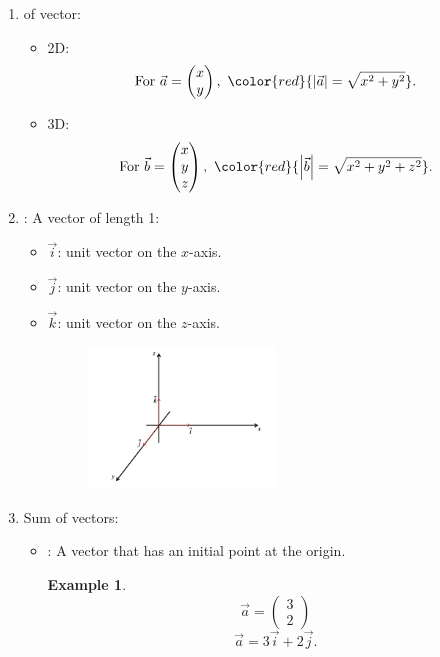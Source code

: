 \documentclass[12pt, a4paper]{article}
\newtheorem{example}{Example}[subsection]
\begin{document}
\begin{enumerate}
\begin{itemize}
  \end{itemize}
  \item \textbf{\color{red}{Magnitude/Modulus}} of vector: 
  \begin{itemize}
    \item 2D: $$\text{For }\vec{a}=\begin{pmatrix}x\\y\end{pmatrix},\ {\color{red}{\left|\vec{a}\right|=\sqrt{x^2+y^2}}}.$$
    \item 3D: $$\text{For }\vec{b}=\begin{pmatrix}x\\y\\z\end{pmatrix},\ {\color{red}{\left|\vec{b}\right|=\sqrt{x^2+y^2+z^2}}}.$$
  \end{itemize}
  \item \textbf{\color{red}{Unit Vector}}: A vector of length 1: 
  \begin{itemize}
    \item $\vec{i}$: unit vector on the $x$-axis.
    \item $\vec{j}$: unit vector on the $y$-axis.
    \item $\vec{k}$: unit vector on the $z$-axis.
    \begin{figure}[H]
      \centering
      \includegraphics[width=0.5\textwidth]{Fig.3.3.jpg}
    \end{figure}
  \end{itemize}
  \item Sum of vectors: 
  \begin{itemize}
    \item \textbf{\color{red}{Position vector}}: A vector that has an initial point at the origin. 
    \begin{example}
      $$\vec{a}=\begin{pmatrix}3\\2\end{pmatrix}$$
      $$\vec{a}=3\vec{i}+2\vec{j}.$$

\end{example}
\end{itemize}
\end{enumerate}
\end{document}
